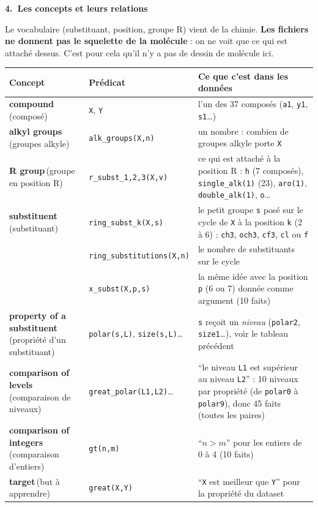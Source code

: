 \documentclass[10pt]{article}
\newcommand{\EN}[2]{\textbf{#1}\,{\scriptsize\textcolor{marine}{(#2)}}}
\newcommand{\titrebox}[2]{\needspace{10\baselineskip}\vspace{8pt}
  \begin{tcolorbox}[colback=marine, colframe=marine, arc=0pt, boxrule=0pt,
    top=4pt, bottom=4pt, left=8pt]
  \color{white}\Large\bfseries #1.~#2
  \end{tcolorbox}\vspace{2pt}}
\newcommand{\st}[1]{\par\needspace{7\baselineskip}\vspace{5pt}{\normalsize\bfseries\textcolor{marine}{#1}}\par\vspace{2pt}}
\begin{document}
\titrebox{4}{Les concepts et leurs relations}
\st{Le vocabulaire, du composé à la comparaison}
Le vocabulaire (substituant, position, groupe R) vient de la chimie. \textbf{Les fichiers ne donnent pas le squelette de la molécule} : on ne voit que ce qui est attaché dessus. C'est pour cela qu'il n'y a pas de dessin de molécule ici.\par\vspace{4pt}
\renewcommand{\arraystretch}{1.25}
\begin{tabular}{@{}L{3.6cm}L{3.9cm}L{8.7cm}@{}}
\textbf{Concept} & \textbf{Prédicat} & \textbf{Ce que c'est dans les données}\\\hline
\EN{compound}{composé} & \texttt{X}, \texttt{Y} & l'un des 37 composés (\texttt{a1}, \texttt{y1}, \texttt{s1}\ldots)\\
\EN{alkyl groups}{groupes alkyle} & \texttt{alk\_groups(X,n)} & un nombre : combien de groupes alkyle porte \texttt{X}\\
\EN{R group}{groupe en position R} & \texttt{r\_subst\_1,2,3(X,v)} & ce qui est attaché à la position R : \texttt{h} (7 composés), \texttt{single\_alk(1)} (23), \texttt{aro(1)}, \texttt{double\_alk(1)}, \texttt{o}\ldots\\
\EN{substituent}{substituant} & \texttt{ring\_subst\_k(X,s)} & le petit groupe \texttt{s} posé sur le cycle de \texttt{X} à la position \texttt{k} (2 à 6) : \texttt{ch3}, \texttt{och3}, \texttt{cf3}, \texttt{cl} ou \texttt{f}\\
 & \texttt{ring\_substitutions(X,n)} & le nombre de substituants sur le cycle\\
 & \texttt{x\_subst(X,p,s)} & la même idée avec la position \texttt{p} (6 ou 7) donnée comme argument (10 faits)\\
\EN{property of a substituent}{propriété d'un substituant} & \texttt{polar(s,L)}, \texttt{size(s,L)}\ldots & \texttt{s} reçoit un \emph{niveau} (\texttt{polar2}, \texttt{size1}\ldots), voir le tableau précédent\\
\EN{comparison of levels}{comparaison de niveaux} & \texttt{great\_polar(L1,L2)}\ldots & ``le niveau \texttt{L1} est supérieur au niveau \texttt{L2}'' : 10 niveaux par propriété (de \texttt{polar0} à \texttt{polar9}), donc 45 faits (toutes les paires)\\
\EN{comparison of integers}{comparaison d'entiers} & \texttt{gt(n,m)} & ``$n>m$'' pour les entiers de 0 à 4 (10 faits)\\
\EN{target}{but à apprendre} & \texttt{great(X,Y)} & ``\texttt{X} est meilleur que \texttt{Y}'' pour la propriété du dataset\\
\end{tabular}
\end{document}
